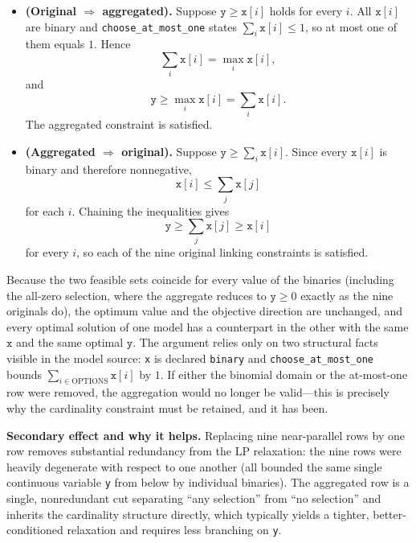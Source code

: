\documentclass{article}
\begin{document}
\begin{itemize}
  \item \textbf{(Original \(\Rightarrow\) aggregated).}
  Suppose \(\mathtt{y} \ge \mathtt{x}[i]\) holds for every \(i\). All \(\mathtt{x}[i]\) are binary and \texttt{choose\_at\_most\_one} states \(\sum_i \mathtt{x}[i] \le 1\), so at most one of them equals \(1\). Hence
  \[
    \sum_i \mathtt{x}[i] = \max_i \mathtt{x}[i],
  \]
  and
  \[
    \mathtt{y} \ge \max_i \mathtt{x}[i] = \sum_i \mathtt{x}[i].
  \]
  The aggregated constraint is satisfied.

  \item \textbf{(Aggregated \(\Rightarrow\) original).}
  Suppose \(\mathtt{y} \ge \sum_i \mathtt{x}[i]\). Since every \(\mathtt{x}[i]\) is binary and therefore nonnegative,
  \[
    \mathtt{x}[i] \le \sum_j \mathtt{x}[j]
  \]
  for each \(i\). Chaining the inequalities gives
  \[
    \mathtt{y} \ge \sum_j \mathtt{x}[j] \ge \mathtt{x}[i]
  \]
  for every \(i\), so each of the nine original linking constraints is satisfied.
\end{itemize}

Because the two feasible sets coincide for every value of the binaries (including the all-zero selection, where the aggregate reduces to \(\mathtt{y} \ge 0\) exactly as the nine originals do), the optimum value and the objective direction are unchanged, and every optimal solution of one model has a counterpart in the other with the same \(\mathtt{x}\) and the same optimal \(\mathtt{y}\). The argument relies only on two structural facts visible in the model source: \texttt{x} is declared \texttt{binary} and \texttt{choose\_at\_most\_one} bounds \(\sum_{i\in\mathrm{OPTIONS}} \mathtt{x}[i]\) by \(1\). If either the binomial domain or the at-most-one row were removed, the aggregation would no longer be valid---this is precisely why the cardinality constraint must be retained, and it has been.

\textbf{Secondary effect and why it helps.}
Replacing nine near-parallel rows by one row removes substantial redundancy from the LP relaxation: the nine rows were heavily degenerate with respect to one another (all bounded the same single continuous variable \texttt{y} from below by individual binaries). The aggregated row is a single, nonredundant cut separating ``any selection'' from ``no selection'' and inherits the cardinality structure directly, which typically yields a tighter, better-conditioned relaxation and requires less branching on \texttt{y}.
\end{document}
